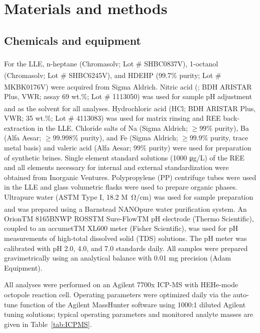 \section{Materials and methods}\label{sec:MnM}

\subsection{Chemicals and equipment}

For the LLE, n-heptane (Chromasolv\textsuperscript{\textregistered}; Lot \# SHBC0837V),
 1-octanol (Chromasolv\textsuperscript{\textregistered}; Lot \# SHBC6245V),
 and HDEHP (99.7\% purity; Lot \# MKBK0176V) were acquired from Sigma Aldrich.
 Nitric acid (; BDH ARISTAR\textsuperscript{\textregistered} Plus, VWR; assay 69 wt.\%; Lot \# 1113050) was used for sample pH adjustment and as the solvent for all analyses.
 Hydrochloric acid (HCl; BDH ARISTAR\textsuperscript{\textregistered} Plus, VWR; 35 wt.\%; Lot \# 4113083) was used for matrix rinsing and REE back-extraction in the LLE.
 Chloride salts of Na (Sigma Aldrich; $\geq99\%$ purity), Ba (Alfa Aesar; $\geq 99.998\%$ purity), and Fe (Sigma Aldrich; $\geq 99.9\%$ purity, trace metal basis) and valeric acid (Alfa Aesar; 99\% purity) were used for preparation of synthetic brines.
 Single element standard solutions (1000 \si{\ug}/L) of the REE and all elements necessary for internal and external standardization were obtained from Inorganic Ventures.
 Polypropylene (PP) centrifuge tubes were used in the LLE and glass volumetric flasks were used to prepare organic phases.
Ultrapure water (ASTM Type I, 18.2 \si{M\ohm}/cm) was used for sample preparation and was prepared using a Barnstead NANOpure\textsuperscript{\textregistered} water purification system.
An OrionTM 8165BNWP ROSSTM Sure-FlowTM pH electrode (Thermo Scientific), coupled to an accumetTM XL600 meter (Fisher Scientific), was used for pH measurements of high-total dissolved solid (TDS) solutions.
The pH meter was calibrated with pH 2.0, 4.0, and 7.0 standards daily.
All samples were prepared gravimetrically using an analytical balance with 0.01 mg precision (Adam Equipment).

All analyses were performed on an Agilent 7700x ICP-MS with HEHe-mode octopole reaction cell.
Operating parameters were optimized daily via the auto-tune function of the Agilent MassHunter software using 1000:1 diluted Agilent tuning solutions;
typical operating parameters and monitored analyte masses are given in Table~\ref{tab:ICPMS}.

